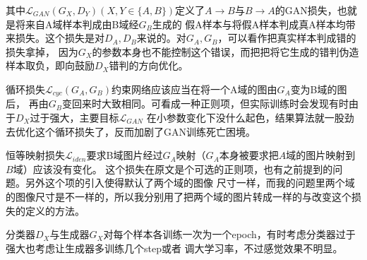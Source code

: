 \documentclass{beamer}
\begin{document}
\begin{frame}
其中$\mathcal{L}_{GAN}(G_X,D_Y)(X,Y \in \{A,B\})$定义了$A \to B$与$B \to A$的GAN损失，也就是将来自A域样本判成由B域经$G_B$生成的
假A样本与将假A样本判成真A样本均带来损失。这个损失是对$D_A,D_B$来说的。对$G_A,G_B$，可以看作把真实样本判成错的损失拿掉，
因为$G_X$的参数本身也不能控制这个错误，而把把将它生成的错判伪造样本取负，即向鼓励$D_X$错判的方向优化。

循环损失$\mathcal{L}_{cyc}(G_A,G_B)$约束网络应该应当在将一个A域的图由$G_A$变为B域的图后，
再由$G_B$变回来时大致相同。可看成一种正则项，但实际训练时会发现有时由于$D_X$过于强大，主要目标$\mathcal{L}_{GAN}$
在小参数变化下没什么起色，结果算法就一股劲去优化这个循环损失了，反而加剧了GAN训练死亡困境。

恒等映射损失$\mathcal{L}_{iden}$要求B域图片经过$G_A$映射（$G_A$本身被要求把$A$域的图片映射到$B$域）应该没有变化。
这个损失在原文\cite{zhu2017unpaired}是个可选的正则项，也有之前提到的问题。另外这个项的引入使得默认了两个域的图像
尺寸一样，而我的问题里两个域的图像尺寸是不一样的，所以我分别用了把两个域的图片转成一样的与改变这个损失的定义的方法。

分类器$D_X$与生成器$G_X$对每个样本各训练一次为一个epoch，有时考虑分类器过于强大也考虑让生成器多训练几个step或者
调大学习率，不过感觉效果不明显。
    
\end{frame}
\end{document}
